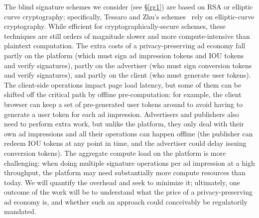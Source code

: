 %
The blind signature schemes we consider (see \S\ref{rg1}) are based on RSA or elliptic curve cryptography; specifically, Tessaro and Zhu's schemes~\cite{EC:TesZhu22} rely on elliptic-curve cryptography.
%
While efficient for cryptographically-secure schemes, these techniques are still orders of magnitude slower and more compute-intensive than plaintext computation.
%
The extra costs of a privacy-preserving ad economy fall partly on the platform (which must sign ad impression tokens and IOU tokens and verify signatures), partly on the advertiser (who must sign conversion tokens and verify signatures), and partly on the client (who must generate user tokens).
%
The client-side operations impact page load latency, but some of them can be shifted off the critical path by offline pre-computation: for example, the client browser can keep a set of pre-generated user tokens around to avoid having to generate a user token for each ad impression.
%
Advertisers and publishers also need to perform extra work, but unlike the platform, they only deal with their own ad impressions and all their operations can happen offline (\eg the publisher can redeem IOU tokens at any point in time, and the advertiser could delay issuing conversion tokens).
%
The aggregate compute load on the platform is more challenging: when doing multiple signature operations per ad impression at a high throughput, the platform may need substantially more compute resources than today.
%
We will quantify the overhead and seek to minimize it; ultimately, one outcome of the work will be to understand what the price of a privacy-preserving ad economy is, and whether such an approach could conceivably be regulatorily mandated.
%
